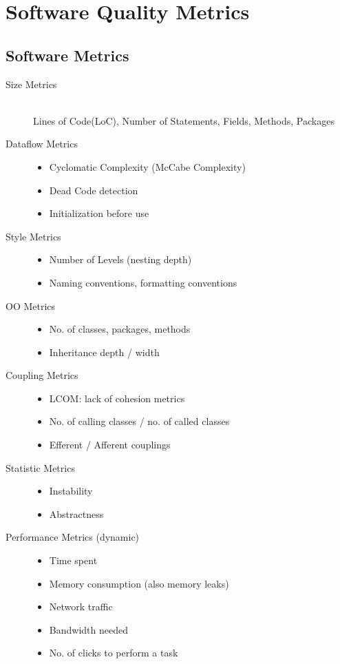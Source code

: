 \documentclass[a4paper,10pt]{article}
\begin{document}
\newpage
\section{Software Quality Metrics}

\subsection{Software Metrics}
\begin{description}
	\item[Size Metrics] \hfill \\
		Lines of Code(LoC), Number of Statements, Fields, Methods, Packages
	\item[Dataflow Metrics] \hfill
		\begin{itemize}
			\item Cyclomatic Complexity (McCabe Complexity)
			\item Dead Code detection
			\item Initialization before use
		\end{itemize}
	\item[Style Metrics] \hfill 
		\begin{itemize}
			\item Number of Levels (nesting depth)
			\item Naming conventions, formatting conventions
		\end{itemize}
	\item[OO Metrics] \hfill
		\begin{itemize}
			\item No. of classes, packages, methods
			\item Inheritance depth / width
		\end{itemize}
	\item[Coupling Metrics] \hfill
		\begin{itemize}
			\item LCOM: lack of cohesion metrics
			\item No. of calling classes / no. of called classes
			\item Efferent / Afferent couplings
		\end{itemize}
	\item[Statistic Metrics] \hfill
		\begin{itemize}
			\item Instability
			\item Abstractness
		\end{itemize}
	\item[Performance Metrics (dynamic)] \hfill 
		\begin{itemize}
			\item Time spent
			\item Memory consumption (also memory leaks)
			\item Network traffic
			\item Bandwidth needed
			\item No. of clicks to perform a task
		\end{itemize}
\end{description}
\end{document}
